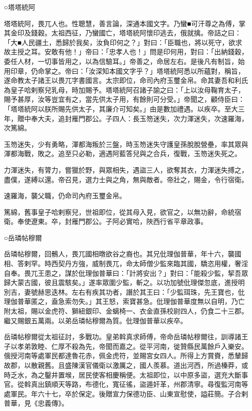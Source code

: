 \begin{pinyinscope}
 ○塔塔統阿



 塔塔統阿，畏兀人也。性聰慧，善言論，深通本國文字。乃蠻■可汗尊之為傅，掌其金印及錢穀。太祖西征，乃蠻國亡，塔塔統阿懷印逃去，俄就擒。帝詰之曰：「大■人民疆土，悉歸於我矣，汝負印何之？」對曰：「臣職也，將以死守，欲求故主授之耳。安敢有他！」帝曰：「忠孝人也！」問是印何用，對曰：「出納錢穀，委任人材，一切事皆用之，以為信驗耳。」帝善之，命居左右。是後凡有制旨，始用印章，仍命掌之。帝曰：「汝深知本國文字乎？」塔塔統阿悉以所蘊對，稱旨，遂命教太子諸王以畏兀字書國言。太宗即位，命司內府玉璽金帛。命其妻吾和利氏為皇子哈剌察兒乳母，時加賜予。塔塔統阿召諸子諭之曰：「上以汝母鞠育太子，賜予甚厚，汝等豈宜有之，當先供太子用，有餘則可分受。」帝聞之，顧侍臣曰：「塔塔統阿以朕所賜先供太子，其廉介可知矣。」由是數加禮遇。以疾卒。至大三年，贈中奉大夫，追封雁門郡公。子四人：長玉笏迷失，次力渾迷失，次速羅海，次篤綿。



 玉笏迷失，少有勇略，渾都海叛於三盤，時玉笏迷失守護皇孫脫脫營壘，率其眾與渾都海戰，敗之。追至只必勒，適遇阿藍答兒與之合兵，復戰，玉笏迷失死之。



 力渾迷失，有膂力，嘗獵於野，與眾相失，遇盜三人，欲奪其衣，力渾迷失搏之，盡僕，遂縛以還。帝召見，選力士與之角，無與敵者。帝壯之，賜金，令行宿衛。



 速羅海，襲父職，仍命司內府玉璽金帛。



 篤綿，舊事皇子哈剌察兒，世祖即位，從其母入見，欲官之，以無功辭，命統宿衛。奉使遼東。卒，封雁門郡公。子阿必實哈，陜西行省平章政事。



 ○岳璘帖穆爾



 岳璘帖穆爾，回鶻人，畏兀國相暾欲谷之裔也。其兄仳理伽普華，年十六，襲國相、答剌罕。時西契丹方強，威制畏兀，命太師僧少監來臨其國，驕恣用權，奢淫自奉。畏兀王患之，謀於仳理伽普華曰：「計將安出？」對曰：「能殺少監，挈吾眾歸大蒙古國，彼且震駭矣。」遂率眾圍少監，斬之。以功加號仳理傑忽底，進授明別吉，妻號赫思迭林。左右有疾其功者，譖於其王曰：「少監珥珠，先王寶也，仳理伽普華匿之，盍急索勿失。」其王怒，索寶甚急。仳理伽普華度無以自明，乃亡附太祖，賜以金虎符、獅紐銀印、金螭椅一、衣金直孫校尉四人，仍食二十三郡。繼又賜銀五萬兩。以弟岳璘帖穆爾為質。仳理伽普華以疾卒。



 岳璘帖穆爾從太祖征討，多戰功。皇弟斡真求師傅，帝命岳璘帖穆爾往，訓導諸王子以孝弟敦睦、仁厚不殺為先，帝聞而嘉之。從平河南，徙贊縣民萬餘戶入樂安。俄授河南等處軍民都達魯花赤，佩金虎符，並賜宮女四人。所得上方賞賚，悉輦歸故郡，以散親舊。且盛陳漢官儀衛以激厲之，國人羨慕。道出河西，所過榛莽，或時乏水，為之鑿井置堠，居民使客相慶稱便。太祖即位，以中原多盜，選充大斷事官。從斡真出鎮順天等路，布德化，寬征徭，盜遁奸革，州郡清寧。尋復監河南等處軍民。年六十七，卒於保定。後贈宣力保德功臣、山東宣慰使，謚莊簡。子合剌普華，見《忠義傳》。




\end{pinyinscope}
